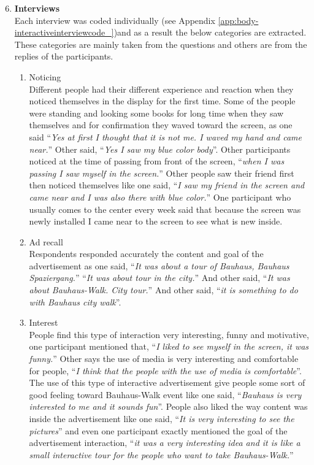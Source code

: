 \begin{enumerate}
\setcounter{enumi}{5}
\item \textbf{Interviews} \\
Each interview was coded individually (see Appendix \ref{app:body-interactiveinterviewcode_})and as a result the below categories are extracted. These categories are mainly taken from the questions and others are from the replies of the participants. 

\begin{enumerate}

\item Noticing \\
    Different people had their different experience and reaction when they noticed themselves in the display for the first time. Some of the people were standing and looking some books for long time when they saw themselves and for confirmation they waved toward the screen, as one said ``\emph{Yes at first I thought that it is not me. I waved my hand and came near.}'' Other said, ``\emph{Yes I saw my blue color body}''. Other participants noticed at the time of passing from front of the screen, ``\emph{when I was passing I saw myself in the screen.}'' Other people saw their friend first then noticed themselves like one said, ``\emph{I saw my friend in the screen and came near and I was also there with blue color.}'' One participant who usually comes to the center every week said that because the screen was newly installed I came near to the screen to see what is new inside.

\item Ad recall \\
    Respondents responded accurately the content and goal of the advertisement as one said, ``\emph{It was about a tour of Bauhaus, Bauhaus Spaziergang.}'' ``\emph{It was about tour in the city.}'' And other said, ``\emph{It was about Bauhaus-Walk. City tour.}'' And other said, ``\emph{it is something to do with Bauhaus city walk}''.

\item Interest \\
    People find this type of interaction very interesting, funny and motivative, one participant mentioned that, ``\emph{I liked to see myself in the screen, it was funny.}'' Other says the use of media is very interesting and comfortable for people, ``\emph{I think that the people with the use of media is comfortable}''. The use of this type of interactive advertisement give people some sort of good feeling toward Bauhaus-Walk event like one said, ``\emph{Bauhaus is very interested to me and it sounds fun}''. People also liked the way content was inside the advertisement like one said, ``\emph{It is very interesting to see the pictures}'' and even one participant exactly mentioned the goal of the advertisement interaction, ``\emph{it was a very interesting idea and it is like a small interactive tour for the people who want to take Bauhaus-Walk.}''


\end{enumerate}
\end{enumerate}
